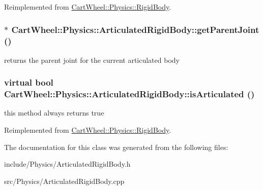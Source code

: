 Reimplemented from \hyperlink{classCartWheel_1_1Physics_1_1RigidBody_a7ab4f12e9d1a403e76022cd8f3124d96}{CartWheel::Physics::RigidBody}.

\hypertarget{classCartWheel_1_1Physics_1_1ArticulatedRigidBody_a273f08463bc8e75240be266c28131e0c}{
\subsubsection[{getParentJoint}]{$\ast$ CartWheel::Physics::ArticulatedRigidBody::getParentJoint ()}}
\label{classCartWheel_1_1Physics_1_1ArticulatedRigidBody_a273f08463bc8e75240be266c28131e0c}
returns the parent joint for the current articulated body \hypertarget{classCartWheel_1_1Physics_1_1ArticulatedRigidBody_aeb046899adbf2017e32249b2a651d846}{
\subsubsection[{isArticulated}]{\setlength{\rightskip}{0pt plus 5cm}virtual bool CartWheel::Physics::ArticulatedRigidBody::isArticulated ()}}
\label{classCartWheel_1_1Physics_1_1ArticulatedRigidBody_aeb046899adbf2017e32249b2a651d846}
this method always returns true 

Reimplemented from \hyperlink{classCartWheel_1_1Physics_1_1RigidBody_aee97ae09ce1b2f4643b39d3422a4243d}{CartWheel::Physics::RigidBody}.



The documentation for this class was generated from the following files:\begin{DoxyCompactItemize}
\item 
include/Physics/ArticulatedRigidBody.h\item 
src/Physics/ArticulatedRigidBody.cpp\end{DoxyCompactItemize}
